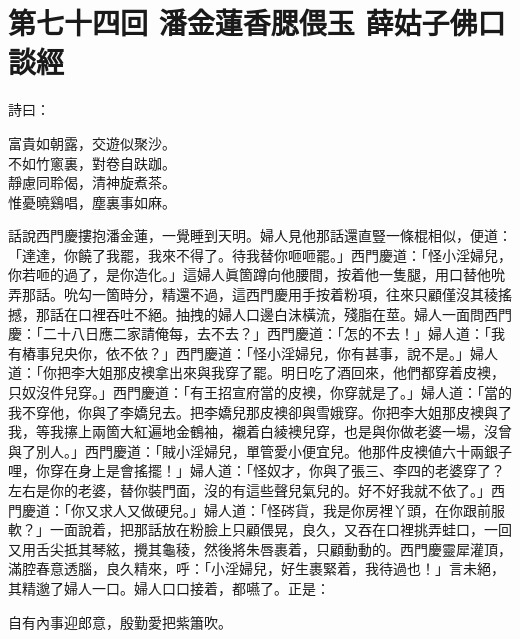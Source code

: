 
\chapter*{第七十四回 潘金蓮香腮偎玉 薛姑子佛口談經}


詩曰：

\begin{myquote}
富貴如朝露，交遊似聚沙。\\不如竹窻裏，對卷自趺跏。\\靜慮同聆偈，清神旋煮茶。\\惟憂曉鷄唱，塵裏事如麻。
\end{myquote}

話說西門慶摟抱潘金蓮，一覺睡到天明。婦人見他那話還直豎一條棍相似，便道：「達達，你饒了我罷，我來不得了。{}待我替你咂咂罷。」西門慶道：「怪小淫婦兒，你若咂的過了，是你造化。」這婦人眞箇蹲向他腰間，按着他一隻腿，用口替他吮弄那話。吮勾一箇時分，精還不過，這西門慶用手按着粉項，往來只顧僅沒其稜搖撼，那話在口裡吞吐不絕。抽拽的婦人口邊白沫橫流，殘脂在莖。婦人一面問西門慶：「二十八日應二家請俺每，去不去？」西門慶道：「怎的不去！」婦人道：「我有樁事兒央你，依不依？」{}西門慶道：「怪小淫婦兒，你有甚事，說不是。」婦人道：「你把李大姐那皮襖拿出來與我穿了罷。明日吃了酒回來，他們都穿着皮襖，只奴沒件兒穿。」西門慶道：「有王招宣府當的皮襖，你穿就是了。」婦人道：「當的我不穿他，你與了李嬌兒去。把李嬌兒那皮襖卻與雪娥穿。你把李大姐那皮襖與了我，等我㩟上兩箇大紅遍地金鶴袖，襯着白綾襖兒穿，也是與你做老婆一場，沒曾與了別人。」{}西門慶道：「賊小淫婦兒，單管愛小便宜兒。他那件皮襖値六十兩銀子哩，你穿在身上是會搖擺！」婦人道：「怪奴才，你與了張三、李四的老婆穿了？左右是你的老婆，替你裝門面，沒的有這些聲兒氣兒的。好不好我就不依了。」西門慶道：「你又求人又做硬兒。」婦人道：「怪硶貨，我是你房裡丫頭，在你跟前服軟？」一面說着，把那話放在粉臉上只顧偎晃，良久，又吞在口裡挑弄蛙口，一回又用舌尖抵其琴絃，攪其龜稜，然後將朱唇裹着，只顧動動的。西門慶靈犀灌頂，滿腔春意透腦，良久精來，呼：「小淫婦兒，好生裹緊着，我待過也！」言未絕，其精邈了婦人一口。婦人口口接着，都嚥了。正是：

\begin{myquote}
自有內事迎郎意，殷勤愛把紫簫吹。
\end{myquote}

